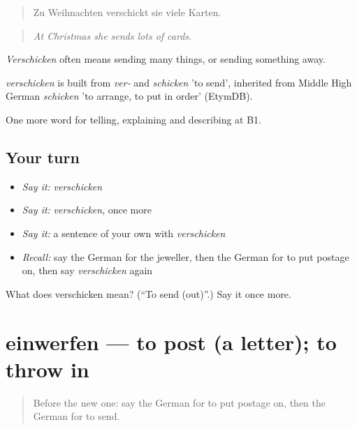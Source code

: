 \begin{quote}
Zu Weihnachten verschickt sie viele Karten.
\end{quote}

\begin{quote}
\emph{At Christmas she sends lots of cards.}
\end{quote}

\emph{Verschicken} often means sending many things, or sending something away.

\begin{cousinweb}
\emph{verschicken} is built from \emph{ver-} and \emph{schicken} 'to send', inherited from Middle High German \emph{schicken} 'to arrange, to put in order' (EtymDB).
\end{cousinweb}

\begin{grammarlens}[title={What you've built}]
One more word for telling, explaining and describing at B1.
\end{grammarlens}

\subsection*{Your turn}
\begin{itemize}
\raggedright
  \item \emph{Say it:} \emph{verschicken}
  \item \emph{Say it:} \emph{verschicken}, once more
  \item \emph{Say it:} a sentence of your own with \emph{verschicken}
  \item \emph{Recall:} say the German for the jeweller, then the German for to put postage on, then say \emph{verschicken} again
\end{itemize}

\begin{tcolorbox}[breakable,colback=teal!4,colframe=teal!35!black,title={Before you move on}]
What does verschicken mean? (\textquotedblleft{}To send (out)\textquotedblright{}.) Say it once more.
\end{tcolorbox}
\section[einwerfen]{einwerfen — to post (a letter); to throw in}

\label{lesson:GE-C448-einwerfen}



\begin{quote}
Before the new one: say the German for to put postage on, then the German for to send.
\end{quote}

